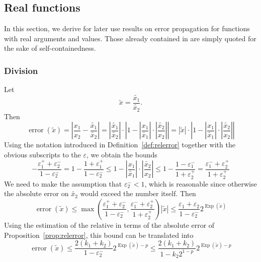 \documentclass [11pt]{article}
\newcommand {\corr}[1]{{#1}}
\newcommand {\appro}[1]{\widetilde {#1}}
\DeclareMathOperator{\Exp}{\operatorname {Exp}}
\newcommand{\error}{\operatorname {error}}
\renewcommand {\epsilon}{\varepsilon}
\renewcommand {\leq}{\leqslant}
\begin{document}
\subsection {Real functions}

In this section, we derive for later use results on error propagation for
functions with real arguments and values. Those already contained in
\cite{MPFRAlgorithms} are simply quoted for the sake of self-containedness.



\subsubsection {Division}
\label {sssec:proprealdiv}

Let
\[
\appro x = \frac {\appro {x_1}}{\appro {x_2}}.
\]
Then
\[
\error (\appro x) = \left|
\frac {\corr {x_1}}{\corr {x_2}} - \frac {\appro {x_1}}{\appro {x_2}} \right|
= \left| \frac {\appro {x_1}}{\appro {x_2}} \right|
\cdot \left|
1 - \left| \frac {\corr {x_1}}{\appro {x_1}} \right|
   \cdot \left| \frac {\appro {x_2}}{\corr {x_2}} \right|
\right|
= | \appro x |
\cdot \left|
1 - \left| \frac {\corr {x_1}}{\appro {x_1}} \right|
   \cdot \left| \frac {\appro {x_2}}{\corr {x_2}} \right|
\right|
\]
Using the notation introduced in Definition~\ref {def:relerror} together
with the obvious subscripts to the $\epsilon$, we obtain the bounds
\[
- \frac {\epsilon_1^+ + \epsilon_2^-}{1 - \epsilon_2^-}
=
1 - \frac {1 + \epsilon_1^+}{1 - \epsilon_2^-}
\leq
1 - \left| \frac {\corr {x_1}}{\appro {x_1}} \right|
   \cdot \left| \frac {\appro {x_2}}{\corr {x_2}} \right|
\leq
1 - \frac {1 - \epsilon_1^-}{1 + \epsilon_2^+}
=
\frac {\epsilon_1^- + \epsilon_2^+}{1 + \epsilon_2^+}
\]
We need to make the assumption that $\epsilon_2^- < 1$, which is reasonable
since otherwise the absolute error on $\appro {x_2}$ would exceed the number
itself. Then
\[
\error (\appro x)
\leq
\max \left(
   \frac {\epsilon_1^+ + \epsilon_2^-}{1 - \epsilon_2^-},
   \frac {\epsilon_1^- + \epsilon_2^+}{1 + \epsilon_2^+}
\right) |\appro x|
\leq
\frac {\epsilon_1 + \epsilon_2}{1 - \epsilon_2^-} 2^{\Exp (\appro x)}
\]
Using the estimation of the relative in terms of the absolute error of
Proposition~\ref {prop:relerror}, this bound can be translated into
\begin {equation}
\label {eq:proprealdiv}
\error (\appro x)
\leq
\frac {2 (k_1 + k_2)}{1 - \epsilon_2^-} 2^{\Exp (\appro x) - p}
\leq
\frac {2 (k_1 + k_2)}{1 - k_2 2^{1 - p}} 2^{\Exp (\appro x) - p}
\end {equation}
\end{document}
